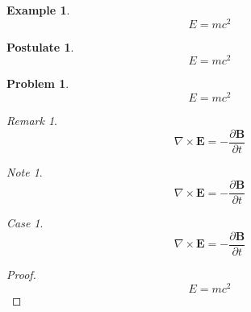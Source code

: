 \documentclass[english,oneside, article]{memoir}
\theoremstyle{plain}
\theoremstyle{definition}
\newtheorem{Example}{Example}[chapter]
\newtheorem{Postulate}{Postulate}[chapter]
\newtheorem{Problem}{Problem}[chapter]
\theoremstyle{remark}
\newtheorem{Case}{Case}[chapter]
\newtheorem*{Remark}{Remark}
\newtheorem*{Note}{Note}
\begin{document}
\begin{Example}

\[E=mc^2\]

\end{Example}

\begin{Postulate}

\[E=mc^2\]

\end{Postulate}

\begin{Problem}

\[E=mc^2\]

\end{Problem}

\begin{Remark}

\[\nabla \times \mathbf{E} = - \frac{\partial \mathbf{B}}{\partial t}\]

\end{Remark}

\begin{Note}

\[\nabla \times \mathbf{E} = - \frac{\partial \mathbf{B}}{\partial t}\]

\end{Note}

\begin{Case}

\[\nabla \times \mathbf{E} = - \frac{\partial \mathbf{B}}{\partial t}\]

\end{Case}

\begin{proof}

\[E=mc^2\]

\end{proof}
\end{document}
